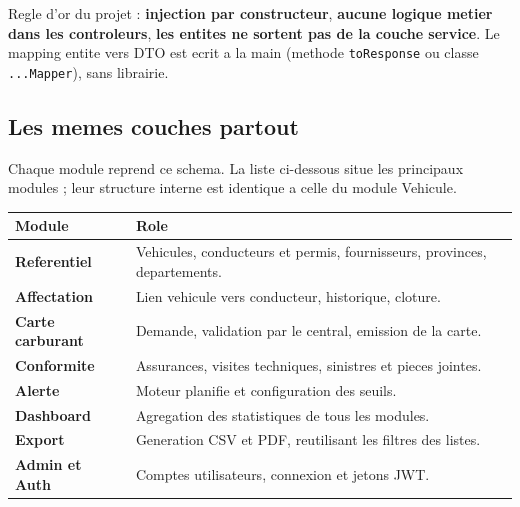 \documentclass[11pt]{article}
\begin{document}
\begin{srmnote}
Regle d'or du projet : \textbf{injection par constructeur}, \textbf{aucune logique metier dans les
controleurs}, \textbf{les entites ne sortent pas de la couche service}. Le mapping entite vers DTO est
ecrit a la main (methode \texttt{toResponse} ou classe \texttt{...Mapper}), sans librairie.
\end{srmnote}

\subsection{Les memes couches partout}
Chaque module reprend ce schema. La liste ci-dessous situe les principaux modules ; leur structure
interne est identique a celle du module Vehicule.
\begin{center}
\renewcommand{\arraystretch}{1.25}
\begin{tabularx}{\linewidth}{>{\bfseries}l Y}
\toprule
{} Module & Role \\
\midrule
Referentiel & Vehicules, conducteurs et permis, fournisseurs, provinces, departements. \\
Affectation & Lien vehicule vers conducteur, historique, cloture. \\
Carte carburant & Demande, validation par le central, emission de la carte. \\
Conformite & Assurances, visites techniques, sinistres et pieces jointes. \\
Alerte & Moteur planifie et configuration des seuils. \\
Dashboard & Agregation des statistiques de tous les modules. \\
Export & Generation CSV et PDF, reutilisant les filtres des listes. \\
Admin et Auth & Comptes utilisateurs, connexion et jetons JWT. \\
\bottomrule
\end{tabularx}
\end{center}
\end{document}
